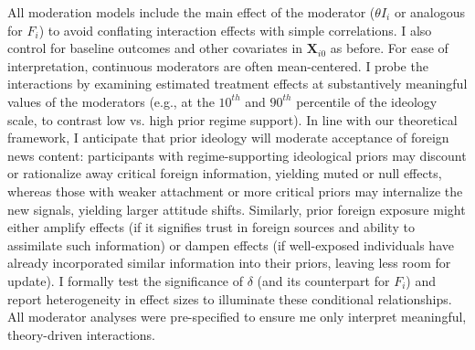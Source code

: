 \documentclass[12pt, american]{article}
\begin{document}
All moderation models include the main effect of the moderator ($\theta I_i$ or analogous for $F_i$) to avoid conflating interaction effects with simple correlations. I also control for baseline outcomes and other covariates in $\mathbf{X}_{i0}$ as before. For ease of interpretation, continuous moderators are often mean-centered. I probe the interactions by examining estimated treatment effects at substantively meaningful values of the moderators (e.g., at the $10^{th}$ and $90^{th}$ percentile of the ideology scale, to contrast low vs. high prior regime support). In line with our theoretical framework, I anticipate that prior ideology will moderate acceptance of foreign news content: participants with regime-supporting ideological priors may discount or rationalize away critical foreign information, yielding muted or null effects, whereas those with weaker attachment or more critical priors may internalize the new signals, yielding larger attitude shifts. Similarly, prior foreign exposure might either amplify effects (if it signifies trust in foreign sources and ability to assimilate such information) or dampen effects (if well-exposed individuals have already incorporated similar information into their priors, leaving less room for update). I formally test the significance of $\delta$ (and its counterpart for $F_i$) and report heterogeneity in effect sizes to illuminate these conditional relationships. All moderator analyses were pre-specified to ensure me only interpret meaningful, theory-driven interactions.
\end{document}
